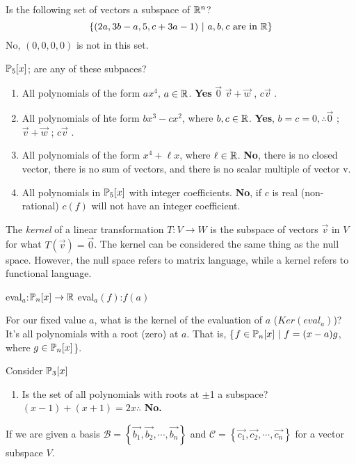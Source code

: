 Is the following set of vectors a subspace of $\mathbb{R}^n$?
\[ \left\{ (2a,3b-a,5,c+3a-1)\ |\ a,b,c \text{ are in } \mathbb{R} \right\}\]
No, $(0,0,0,0)$ is not in this set.
\begin{example}$\mathbb{P}_5[x]$; are any of these subpaces?
\begin{enumerate}
\item All polynomials of the form $ax^4$, $a \in \mathbb{R}$. \textbf{Yes} $\vec{0}$ \checkmark $\vec{v}+\vec{w}$ \checkmark, $c\vec{v}$ \checkmark.

\item All polynomials of hte form $bx^3-cx^2$, where $b,c \in \mathbb{R}$. \textbf{Yes}, $b=c=0, \therefore \vec{0}$ \checkmark; $\vec{v}+\vec{w}$ \checkmark; $c\vec{v}$ \checkmark.

\item All polynomials of the form $x^4 + \ell x$, where $\ell \in \mathbb{R}$. \textbf{No}, there is no closed vector, there is no sum of vectors, and there is no scalar multiple of vector v.

\item All polynomials in $\mathbb{P}_5[x]$ with integer coefficients. \textbf{No}, if $c$ is real (non-rational) $c(f)$ will not have an integer coefficient.
\end{enumerate}
\end{example}
The \emph{kernel} of a linear transformation $T:V\to W$ is the subspace of vectors $\vec{v}$ in $V$ for what $T(\vec{v}) = \vec{0}$. The kernel can  be considered the same thing as the null space. However, the null space refers to matrix language, while a kernel refers to functional language.

eval$_a$:$\mathbb{P}_n[x]\to\mathbb{R}$
eval$_a(f)$:$f(a)$

For our fixed value $a$, what is the kernel of the evaluation of $a$ ($Ker(eval_a)$)? It's all polynomials with a root (zero) at $a$. That is, \{$f \in \PP_n[x]\ |\ f=(x-a)g$, where $g \in \mathbb{P}_n[x]$\}.
\begin{example}
Consider $\mathbb{P}_3[x]$
\begin{enumerate}
\item Is the set of all polynomials with roots at $\pm$1 a subspace? $(x-1)+(x+1)=2x \therefore$ \textbf{No.}
\end{enumerate}
\end{example}

If we are given a basis $\mathcal{B} = \left\{ \vec{b_1}, \vec{b_2}, \cdots, \vec{b_n} \right\}$ and $\mathcal{C} = \left\{ \vec{c_1}, \vec{c_2}, \cdots, \vec{c_n} \right\}$ for a vector subspace $V$.

